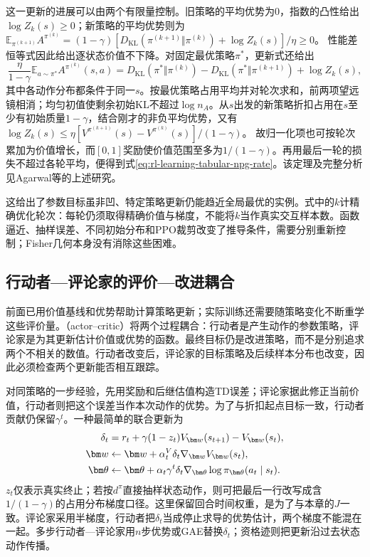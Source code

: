 这一更新的进展可以由两个有限量控制。旧策略的平均优势为0，指数的凸性给出$\log Z_k(s)\geq0$；新策略的平均优势则为
$\mathbb E_{\pi^{(k+1)}}A^{\pi^{(k)}}
=(1-\gamma)[D_{\mathrm{KL}}(\pi^{(k+1)}\Vert\pi^{(k)})+\log Z_k(s)]/\eta\geq0$。
性能差恒等式因此给出逐状态价值不下降。对固定最优策略$\pi^*$，更新式还给出
\[
 \frac{\eta}{1-\gamma}
       \mathbb E_{a\sim\pi^*}A^{\pi^{(k)}}(s,a)
 =D_{\mathrm{KL}}(\pi^*\Vert\pi^{(k)})
  -D_{\mathrm{KL}}(\pi^*\Vert\pi^{(k+1)})+\log Z_k(s),
\]
其中各动作分布都条件于同一$s$。按最优策略占用平均并对轮次求和，前两项望远镜相消；均匀初值使剩余初始KL不超过$\log n_A$。从$s$出发的新策略折扣占用在$s$至少有初始质量$1-\gamma$，结合刚才的非负平均优势，又有
$\log Z_k(s)\leq
\eta[V^{\pi^{(k+1)}}(s)-V^{\pi^{(k)}}(s)]/(1-\gamma)$。
故归一化项也可按轮次累加为价值增长，而$[0,1]$奖励使价值范围至多为$1/(1-\gamma)$。再用最后一轮的损失不超过各轮平均，便得到式\eqref{eq:rl-learning-tabular-npg-rate}。该定理及完整分析见Agarwal等的上述研究。

这给出了参数目标虽非凹、特定策略更新仍能趋近全局最优的实例。式中的$k$计精确优化轮次：每轮仍须取得精确价值与梯度，不能将$k$当作真实交互样本数。函数逼近、抽样误差、不同初始分布和PPO裁剪改变了推导条件，需要分别重新控制；Fisher几何本身没有消除这些困难。

\subsection{行动者—评论家的评价—改进耦合}
\label{sec:rl-learning-actor-critic}

前面已用价值基线和优势帮助计算策略更新；实际训练还需要随策略变化不断重学这些评价量。（actor--critic）将两个过程耦合：行动者是产生动作的参数策略，评论家是为其更新估计价值或优势的函数。最终目标仍是改进策略，而不是分别追求两个不相关的数值。行动者改变后，评论家的目标策略及后续样本分布也改变，因此必须检查两个更新能否相互跟踪。

对同策略的一步经验，先用奖励和后继估值构造TD误差；评论家据此修正当前价值，行动者则把这个误差当作本次动作的优势。为了与折扣起点目标一致，行动者贡献仍保留$\gamma^t$。一种最简单的联合更新为
\begin{align}
  \delta_t&=r_t+\gamma(1-z_t)V_{\bm w}(s_{t+1})-V_{\bm w}(s_t),
       \notag\\
  \bm w&\gets\bm w+\alpha_t^V\delta_t\nabla_{\bm w}V_{\bm w}(s_t),
       \notag\\
  \bm\theta&\gets\bm\theta+
       \alpha_t\gamma^t\delta_t
          \nabla_{\bm\theta}\log\pi_{\bm\theta}(a_t\mid s_t).
  \label{eq:rl-learning-one-step-ac}
\end{align}
$z_t$仅表示真实终止；若按$d^\pi$直接抽样状态动作，则可把最后一行改写成含$1/(1-\gamma)$的占用分布梯度口径。这里保留回合时间权重，是为了与本章的$J$一致。评论家采用半梯度，行动者把$\delta_t$当成停止求导的优势估计，两个梯度不能混在一起。多步行动者—评论家用$n$步优势或GAE替换$\delta_t$；资格迹则把更新沿过去状态动作传播。


